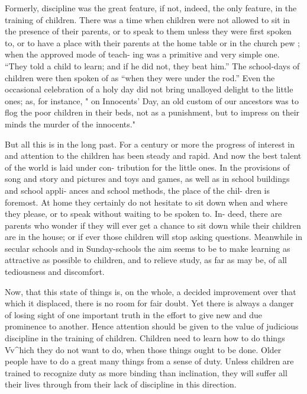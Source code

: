 \documentclass[
]{book}
\begin{document}
Formerly, discipline was the great feature, if not, indeed, the only feature, in the training of children. There was a time when children were not allowed to sit in the presence of their parents, or to speak to them unless they were first spoken to, or to have a place with their parents at the home table or in the church pew ; when the approved mode of teach- ing was a primitive and very simple one. ``They told a child to learn; and if he did not, they beat him.'' The school-days of children were then spoken of as ``when they were under the rod.'' Even the occasional celebration of a holy day did not bring unalloyed delight to the little ones; as, for instance, " on Innocents' Day, an old custom of our ancestors was to flog the poor children in their beds, not as a punishment, but to impress on their minds the murder of the innocents."

But all this is in the long past. For a century or more the progress of interest in and attention to the children has been steady and rapid. And now the best talent of the world is laid under con- tribution for the little ones. In the provisions of song and story and pictures and toys and games, as well as in school buildings and school appli- ances and school methods, the place of the chil- dren is foremost. At home they certainly do not hesitate to sit down when and where they please, or to speak without waiting to be spoken to. In- deed, there are parents who wonder if they will ever get a chance to sit down while their children are in the house; or if ever those children will stop asking questions. Meanwhile in secular schools and in Sunday-schools the aim seems to be to make learning as attractive as possible to children, and to relieve study, as far as may be, of all tediousness and discomfort.

Now, that this state of things is, on the whole, a decided improvement over that which it displaced, there is no room for fair doubt. Yet there is always a danger of losing sight of one important truth in the effort to give new and due prominence to another. Hence attention should be given to the value of judicious discipline in the training of children. Children need to learn how to do things Vv\^{}hich they do not want to do, when those things ought to be done. Older people have to do a great many things from a sense of duty. Unless children are trained to recognize duty as more binding than inclination, they will suffer all their lives through from their lack of discipline in this direction.
\end{document}
